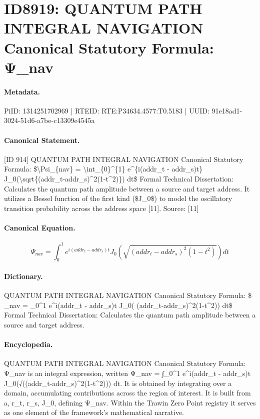 \section*{ID8919: QUANTUM PATH INTEGRAL NAVIGATION Canonical Statutory Formula: Ψ\_nav}
\paragraph{Metadata.}
PiID: 1314251702969 | RTEID: RTE:P34634.4577:T0.5183 | UUID: 91e18ad1-3024-51d6-a7be-c13309e4545a

\paragraph{Canonical Statement.}
[ID 914] QUANTUM PATH INTEGRAL NAVIGATION Canonical Statutory Formula: \$\textbackslash{}Psi\_\{nav\} = \textbackslash{}int\_\{0\}\textasciicircum{}\{1\} e\textasciicircum{}\{i(addr\_t - addr\_s)t\} J\_0(\textbackslash{}sqrt\{(addr\_t-addr\_s)\textasciicircum{}2(1-t\textasciicircum{}2)\}) dt\$ Formal Technical Dissertation: Calculates the quantum path amplitude between a source and target address. It utilizes a Bessel function of the first kind (\$J\_0\$) to model the oscillatory transition probability across the address space [11]. Source: [11]

\paragraph{Canonical Equation.}
\[
\Psi_{nav} = \int_{0}^{1} e^{i(addr_t - addr_s)t} J_0(\sqrt{(addr_t-addr_s)^2(1-t^2)}) dt
\]

\paragraph{Dictionary.}
QUANTUM PATH INTEGRAL NAVIGATION Canonical Statutory Formula: \$ \_nav = \_0\textasciicircum{}1 e\textasciicircum{}i(addr\_t - addr\_s)t J\_0( (addr\_t-addr\_s)\textasciicircum{}2(1-t\textasciicircum{}2)) dt\$ Formal Technical Dissertation: Calculates the quantum path amplitude between a source and target address.

\paragraph{Encyclopedia.}
QUANTUM PATH INTEGRAL NAVIGATION Canonical Statutory Formula: Ψ\_nav is an integral expression, written Ψ\_nav = ∫\_0\textasciicircum{}1 e\textasciicircum{}i(addr\_t - addr\_s)t J\_0(√((addr\_t-addr\_s)\textasciicircum{}2(1-t\textasciicircum{}2))) dt. It is obtained by integrating over a domain, accumulating contributions across the region of interest. It is built from a, r\_t, r\_s, J\_0, defining Ψ\_nav. Within the Trawin Zero Point registry it serves as one element of the framework's mathematical narrative.
